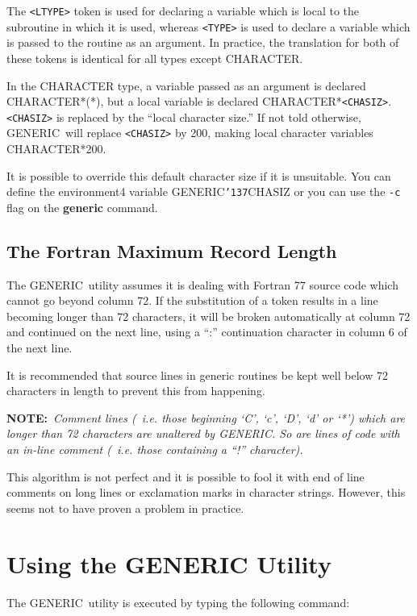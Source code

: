 \documentclass[twoside,11pt]{article}
\renewcommand{\_}{{\tt\char'137}}     %
\newcommand{\GENERIC}{{\footnotesize GENERIC}\normalsize}
\begin{document}
The \verb+<LTYPE>+ token is used for declaring a variable which is local
to the subroutine in which it is used, whereas \verb+<TYPE>+ is used
to declare a variable which is passed to the routine as an argument.
In practice, the translation for both of these tokens is identical
for all types except CHARACTER.

In the CHARACTER type, a variable passed as an argument is declared
CHARACTER*(*), but a local variable is declared CHARACTER*\verb+<CHASIZ>+.
\verb+<CHASIZ>+ is replaced by the ``local character size.''
If not told otherwise, \GENERIC\ will replace \verb+<CHASIZ>+ by 200,
making local character variables CHARACTER*200.

It is possible to override this default character size
if it is unsuitable.  You can define the environment4 variable
GENERIC\_CHASIZ or you can use the {\tt -c} flag on the
{\bf generic} command.

\subsection{The Fortran Maximum Record Length}

The \GENERIC\ utility assumes it is dealing with Fortran 77
source code which cannot go beyond column 72.
If the substitution of a token results in a line becoming longer
than 72 characters, it will be broken automatically at column 72
and continued on the next line, using a ``:'' continuation character
in column 6 of the next line.

It is recommended that source lines in generic routines be kept
well below 72 characters in length to prevent this from happening.

{\bf NOTE:}~{\it Comment lines (~{\rm i.e.} those beginning `C', `c', `D', `d'
or `*') which are longer than 72 characters are unaltered by \GENERIC.
So are lines of code with an in-line comment (~\emph{i.e.} those containing
a ``!'' character).}

This algorithm is not perfect and it is possible to fool it with end
of line comments on long lines or exclamation marks in character
strings.  However, this seems not to have proven a problem in practice.

\section{Using the GENERIC Utility}

The \GENERIC\ utility is executed by typing the following command:
\end{document}
